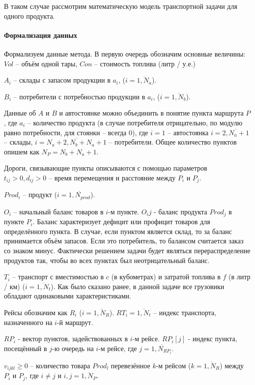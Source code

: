 	В таком случае рассмотрим математическую модель транспортной задачи для одного продукта.
	\paragraph{Формализация данных}
	Формализуем данные метода. В первую очередь обозначим основные величины: $Vol$ -- объём одной тары, $Con$ -- стоимость топлива (литр / у.е.)
	
	$A_i$ -- склады с запасом продукции в $a_i$, ($i = \overline{1, N_a}$).
	
	$B_i$ -- потребители с потребностью продукции в $a_i$, ($i = \overline{1, N_b}$).
	
	Данные об $A$ и $B$ и автостоянке можно объединить в понятие пункта маршрута $P$, где $a_i$ -- количество продукта (в случае потребителя отрицательно, по модулю равно потребности, для стоянки -- всегда 0), где $i = 1$ -- автостоянка $i = \overline{2, N_a + 1}$ -- склады, $i = \overline{N_a+2, N_b+N_a+1}$ -- потребители. Общее количество пунктов опишем как $N_P= N_b+N_a+1$.
	
	Дороги, связывающие пункты описываются с помощью параметров $t_{ij} > 0, d_{ij} > 0$ -- время перемещения и расстояние между $P_i$ и $P_j$.
	
	$Prod_i$ -- продукт ($i = \overline{1, N_{prod}}$).
	
	$O_i$ -- начальный баланс товаров в $i$-м пункте. $O_ij$ - баланс продукта $Prod_j$ в пункте $P_i$. Баланс характеризует дефицит или профицит товаров для определённого пункта. В случае, если пунктом является склад, то за баланс принимается объём запасов. Если это потребитель, то балансом считается заказ со знаком минус. Фактически решением задачи будет являться перераспределение продуктов так, чтобы во всех пунктах был неотрицательный баланс. 

	$T_i$ -- транспорт с вместимостью в $c$ (в кубометрах) и затратой топлива в $f$ (в литр / км) ($i = \overline{1, N_t}$). Как было сказано ранее, в данной задаче все грузовики обладают одинаковыми характеристиками.
	
	Рейсы обозначим как $R_i$ ($i = \overline{1, N_R}$). $RT_i = \overline{1, N_t}$ -- индекс транспорта, назначенного на $i$-й маршрут.
	
	$RP_i$ - вектор пунктов, задействованных в $i$-м рейсе. $RP_i[j]$ - индекс пункта, посещённый в $j$-ю очередь на $i$-м рейсе, где $j = \overline{1, N_{RP_i}}$.
	
	$v_{ijkl} \ge 0$ -- количество товара $Prod_l$ перевезённое $k$-м рейсом ($k = \overline{1, N_R}$) между $P_i$ и $P_j$, где $i \ne j$ и $i, j = \overline{1, N_P}$. 
	
